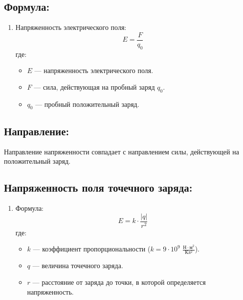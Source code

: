 \documentclass[a4paper,12pt]{article}
\begin{document}
\subsection*{Формула:}
\vspace{-3pt}
\begin{enumerate}[itemsep=0pt, topsep=0pt, parsep=3pt]
  \item Напряженность электрического поля:
  \vspace{-0.05em}
  $$ E = \frac{F}{q_0} $$
  где:
  \begin{itemize} [itemsep=0pt, topsep=0pt, parsep=0pt]
    \item $E$ — напряженность электрического поля.
    \item $F$ — сила, действующая на пробный заряд $q_0$.
    \item $q_0$ — пробный положительный заряд.
  \end{itemize}
\end{enumerate}

\vspace{-9pt}
\subsection*{Направление:}
\vspace{-3pt}
Направление напряженности совпадает с направлением силы, действующей на положительный заряд.

\vspace{-9pt}
\subsection*{Напряженность поля точечного заряда:}
\vspace{-3pt}
\begin{enumerate}[itemsep=0pt, topsep=0pt, parsep=3pt]
  \item Формула:
  \vspace{-0.05em}
  $$ E = k \cdot \frac{|q|}{r^2} $$
  где:
  \begin{itemize} [itemsep=0pt, topsep=0pt, parsep=0pt]
    \item $k$ — коэффициент пропорциональности ($k = 9 \cdot 10^9$ $\frac{Н \cdot м^2}{Кл^2}$).
    \item $q$ — величина точечного заряда.
    \item $r$ — расстояние от заряда до точки, в которой определяется напряженность.
  \end{itemize}
\end{enumerate}
\end{document}
